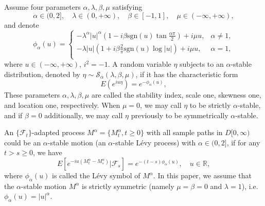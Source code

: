 \documentclass[11pt]{amsart}
\theoremstyle{plain}
\numberwithin{equation}{section}
\begin{document}
Assume four parameters $\alpha,\lambda,\beta,\mu$ satisfying 
$$
\alpha \in(0,2],\quad \lambda \in(0,+\infty),\quad \beta\in[-1,1],\quad \mu\in(-\infty,+\infty),
$$
and denote
\begin{equation*}
\phi_\alpha(u) =
\begin{cases}
-\lambda^\alpha|u|^\alpha(1-i\beta \text{sgn}(u)\tan\frac{\alpha\pi}{2})+i\mu u, & \alpha \neq 1 ,\\
-\lambda|u|(1+i\beta\frac{2}{\pi} \text{sgn}(u)\log|u|)+i\mu u,&\alpha =1,\\
\end{cases}
\end{equation*}
where $u\in(-\infty,+\infty)$, $i^2=-1$. A random variable $\eta$ subjects to an $\alpha$-stable distribution, denoted by $\eta \sim \mathcal{S}_\alpha(\lambda,\beta,\mu)$, if it has the characteristic form
\begin{equation*}
E(e^{iu\eta})=e^{-\phi_\alpha(u)},
\end{equation*}
These parameters $\alpha,\lambda,\beta,\mu$ are called the stability index, scale one, skewness one, and location one, respectively. When $\mu=0$, we may call $\eta$ to be strictly $\alpha$-stable, and if $\beta=0$ additionally, we may call $\eta$ previously to be symmetrically $\alpha$-stable. 

An $\{\mathscr{F}_t\}$-adapted process $M^\alpha = \{M_t^\alpha, t \geq 0\}$ with all sample paths in $D[0,\infty)$ could be an $\alpha$-stable motion (an $\alpha$-stable L\'{e}vy process) with $\alpha \in (0,2]$, if for any $t>s\geq 0$, we have 
$$
E\left[e^{-iu(M^\alpha_t-M^\alpha_s)}|\mathscr{F}_s\right]=e^{-(t-s)\phi _\alpha(u)},\quad  u\in \mathbb{R},
$$
where $\phi _\alpha(u)$ is called the L\'{e}vy symbol of $M^\alpha$. In this paper, we assume that the $\alpha$-stable motion $M^\alpha$ is strictly symmetric (namely $\mu=\beta=0$ and $\lambda=1$), i.e. $\phi_\alpha(u)=|u|^\alpha$.
\end{document}
